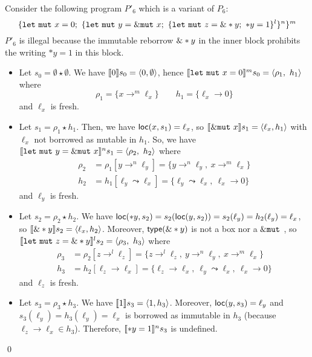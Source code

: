 \begin{example}
  Consider the following program $P'_6$ which is a variant of $P_6$:
  \[
  \{
    \mathtt{let\ mut}\ x = 0;\
    \{
      \mathtt{let\ mut}\ y = \mutborrow x;\
        \{
          \mathtt{let\ mut}\ z = \borrow*y;\
          *y = 1
        \}^l
      \}^n
    \}^m
  \]
  $P'_6$ is illegal because the immutable reborrow $\borrow *y$ in the inner
  block prohibits the writing $*y = 1$ in this block.
  \begin{itemize}
    \item Let $s_0=\emptyset \star \emptyset$.
    We have $\den[0]{s_0} = \langle 0,\emptyset\rangle$, hence
    $\denl[\mathtt{let\ mut}\ x = 0]{m}{s_0} =
    \langle \rho_1,\ h_1\rangle$ where
    \[\rho_1=\{x\to^m\ell_x\} \qquad
    h_1 = \{\ell_x\to 0\}\]
    and $\ell_x$ is fresh.
    \item Let $s_1 = \rho_1 \star h_1$.
    Then, we have $\loc(x,s_1) = \ell_x$, so
    $\den[\mutborrow x]{s_1} = \langle\ell_x, h_1\rangle$
    with $\ell_x$ not borrowed as mutable in $h_1$.
    So, we have
    $\denl[\mathtt{let\ mut}\ y = \mutborrow x]{n}{s_1} =
    \langle \rho_2,\ h_2\rangle$
    where
    \begin{align*}
      \rho_2 & = \rho_1[y\to^n\ell_y] = \{y\to^n\ell_y,\ x\to^m\ell_x\}\\
      h_2 & = h_1[\ell_y\leadsto \ell_x] =
      \{\ell_y\leadsto \ell_x,\ \ell_x\to 0\}
    \end{align*}
    and $\ell_y$ is fresh.
    \item Let $s_2 = \rho_2 \star h_2$.
    We have $\loc(*y,s_2) = s_2(\loc(y,s_2)) = s_2(\ell_y) = h_2(\ell_y) = \ell_x$,
    so $\den[\borrow*y]{s_2} = \langle \ell_x,h_2\rangle$.
    Moreover, $\type(\borrow*y)$ is not a box nor a $\mutborrow$, so
    $\denl[\mathtt{let\ mut}\ z = \borrow*y]{l}{s_2} =
    \langle \rho_3,\ h_3\rangle$
    where
    \begin{align*}
      \rho_3 & = \rho_2[z\to^l\ell_z] = \{z\to^l\ell_z,\ y\to^n\ell_y,\ x\to^m\ell_x\}\\
      h_3 & = h_2[\ell_z\to \ell_x] =
      \{\ell_z\to \ell_x,\ \ell_y\leadsto \ell_x,\ \ell_x\to 0\}
    \end{align*}
    and $\ell_z$ is fresh.
    \item Let $s_3 = \rho_3 \star h_3$.
    We have $\den[1]{s_3} = \langle 1,h_3\rangle$. Moreover,
    $\loc(y,s_3) = \ell_y$ and $s_3(\ell_y) = h_3(\ell_y) = \ell_x$
    is borrowed as immutable in $h_3$ (because $\ell_z\to \ell_x \in h_3$).
    Therefore, $\denl[*y = 1]{n}{s_3}$ is undefined.
  \end{itemize}
  \qed
\end{example}
